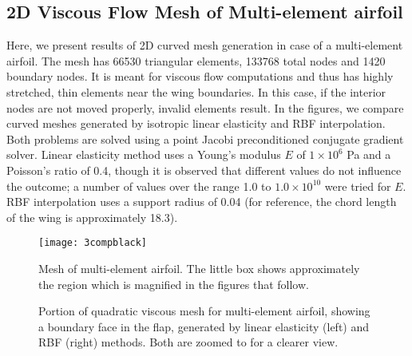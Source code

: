  \subsection{2D Viscous Flow Mesh of Multi-element airfoil}
 Here, we present results of 2D curved mesh generation in case of a multi-element airfoil. The mesh has 66530 triangular elements, 133768 total nodes and 1420 boundary nodes. It is meant for viscous flow computations and thus has highly stretched, thin elements near the wing boundaries. In this case, if the interior nodes are not moved properly, invalid elements result. In the figures, we compare curved meshes generated by isotropic linear elasticity and RBF interpolation. Both problems are solved using a point Jacobi preconditioned conjugate gradient solver. Linear elasticity method uses a Young's modulus $E$ of $1\times 10^6$ Pa and a Poisson's ratio of 0.4, though it is observed that different values do not influence the outcome; a number of values over the range 1.0 to $1.0 \times 10^{10}$ were tried for $E$. RBF interpolation uses a support radius of 0.04 (for reference, the chord length of the wing is approximately 18.3).
 
 \begin{figure}
 	\centering
 	\texttt{[image: 3compblack]}
 	\caption{Mesh of multi-element airfoil. The little box shows approximately the region which is magnified in the figures that follow.}
 \end{figure}
 
 
 \begin{figure}
 	\centering
 	\caption{Portion of quadratic viscous mesh for multi-element airfoil, showing a boundary face in the flap, generated by linear elasticity (left) and RBF (right) methods. Both are zoomed to for a clearer view.}
 	\label{fig:tangled2}
 \end{figure}
 
